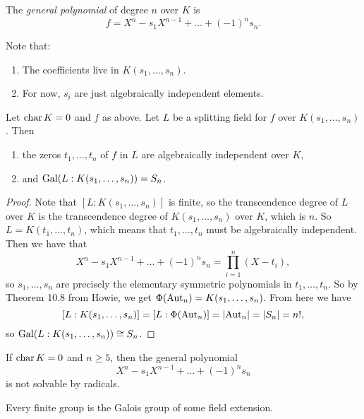 \begin{definition}
  The \emph{general polynomial} of degree $n$ over $K$ is
  \[
    f = X^n - s_1X^{n - 1} + \dots + (-1)^n s_n.
  \]
\end{definition}

\begin{remark}
  Note that:
  \begin{enumerate}
    \item The coefficients live in $K(s_1, \dots, s_n)$.
    \item For now, $s_i$ are just algebraically
      independent elements.
  \end{enumerate}
\end{remark}

\begin{theorem}
  \label{thm:realize-sn}
  Let $\operatorname{char} K = 0$ and $f$ as above. Let $L$ be a
  splitting field for $f$ over $K(s_1, \dots, s_n)$.
  Then
  \begin{enumerate}
    \item the zeros $t_1, \dots, t_n$ of $f$ in $L$
      are algebraically independent over $K$,
    \item and $\operatorname{Gal}(L : K(s_1, \dots, s_n)) = S_n$.
  \end{enumerate}
\end{theorem}

\begin{proof}
  Note that $[L : K(s_1, \dots, s_n)]$ is finite, so
  the transcendence degree of $L$ over $K$ is
  the transcendence degree of $K(s_1, \dots, s_n)$ over
  $K$, which is $n$. So $L = K(t_1, \dots, t_n)$, which
  means that $t_1, \dots, t_n$ must be algebraically
  independent. Then we have that
  \[
    X^n - s_1X^{n - 1} + \dots + (-1)^n s_n
    = \prod_{i = 1}^n (X - t_i),
  \]
  so $s_1, \dots, s_n$ are precisely the elementary
  symmetric polynomials in $t_1, \dots, t_n$. So by
  Theorem 10.8 from Howie, we get $\Phi(\operatorname{Aut}_n) = K(s_1, \dots, s_n)$.
  From here we have
  \[
    [L : K(s_1, \dots, s_n)]
    = [L : \Phi(\operatorname{Aut}_n)]
    = |{\operatorname{Aut}_n}| = |S_n| = n!,
  \]
  so $\operatorname{Gal}(L : K(s_1, \dots, s_n)) \cong S_n$.
\end{proof}

\begin{corollary}
  If $\operatorname{char} K = 0$ and $n \ge 5$, then the general
  polynomial
  \[
    X^n - s_1X^{n - 1} + \dots + (-1)^n s_n
  \]
  is not solvable by radicals.
\end{corollary}

\begin{corollary}
  Every finite group is the Galois group of some
  field extension.
\end{corollary}


